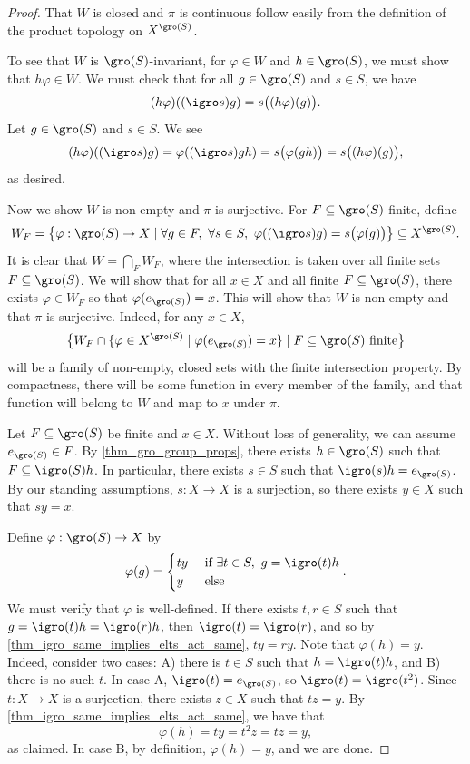 \begin{proof}
    That $W$ is closed and $\pi$ is continuous follow easily from the definition of the product topology on $X^{\gro(S)}$.

    To see that $W$ is $\gro(S)$-invariant, for $\varphi \in W$ and $h \in \gro(S)$, we must show that $h \varphi \in W$.  We must check that for all $g \in \gro(S)$ and $s \in S$, we have
    \[
        (h \varphi) ((\igro s)g) = s \big((h \varphi) (g) \big).
    \]
    Let $g \in \gro(S)$ and $s \in S$.  We see
    \[
        (h \varphi) ((\igro s)g) = \varphi((\igro s)gh) = s \big(\varphi(gh)\big) = s \big((h \varphi) (g) \big),
    \]
    as desired.

    Now we show $W$ is non-empty and $\pi$ is surjective. For $F \subseteq \gro(S)$ finite, define
    \[
        W_F = \big\{ \varphi: \gro(S) \to X \mid \forall g \in F, \ \forall s \in S, \ \varphi((\igro s)g) = s \big(\varphi (g)\big) \big\} \subseteq X^{\gro(S)}.
    \]
    It is clear that $W = \bigcap_F W_F$, where the intersection is taken over all finite sets $F \subseteq \gro(S)$.  We will show that for all $x \in X$ and all finite $F \subseteq \gro(S)$, there exists $\varphi \in W_F$ so that $\varphi(e_{\gro(S)}) = x$.  This will show that $W$ is non-empty and that $\pi$ is surjective. 
    Indeed, for any $x \in X$,
    \[\big\{ W_F \cap \{\varphi \in X^{\gro(S)} \mid \varphi(e_{\gro(S)}) = x\} \mid F \subseteq \gro(S) \text{ finite} \big\}\]
    will be a family of non-empty, closed sets with the finite intersection property.  By compactness, there will be some function in every member of the family, and that function will belong to $W$ and map to $x$ under $\pi$.

    Let $F \subseteq \gro(S)$ be finite and $x \in X$.  Without loss of generality, we can assume $e_{\gro(S)} \in F$. By \cref{thm_gro_group_props}, there exists $h \in \gro(S)$ such that $F \subseteq \igro(S) h$.  In particular, there exists $s \in S$ such that $\igro(s) h = e_{\gro(S)}$.  By our standing assumptions, $s: X \to X$ is a surjection, so there exists $y \in X$ such that $sy = x$.

    Define $\varphi : \gro(S) \to X$ by
    \[
        \varphi(g) = \begin{cases} ty & \text{ if } \exists t \in S, \ g = \igro(t) h \\ y & \text{ else } \end{cases}.
    \]
    We must verify that $\varphi$ is well-defined. If there exists $t, r \in S$ such that $g = \igro(t) h = \igro(r) h$, then $\igro(t) = \igro(r)$, and so by \cref{thm_igro_same_implies_elts_act_same}, $ty = ry$.  Note that $\varphi(h) = y$.  Indeed, consider two cases: A) there is $t \in S$ such that $h = \igro(t) h$, and B) there is no such $t$.  In case A, $\igro(t) = e_{\gro(S)}$, so $\igro(t) = \igro(t^2)$. Since $t: X \to X$ is a surjection, there exists $z \in X$ such that $tz = y$.  By \cref{thm_igro_same_implies_elts_act_same}, we have that
    \[\varphi(h) = ty = t^2 z = tz = y,\]
    as claimed. In case B, by definition, $\varphi(h) = y$, and we are done.
    

\end{proof}
